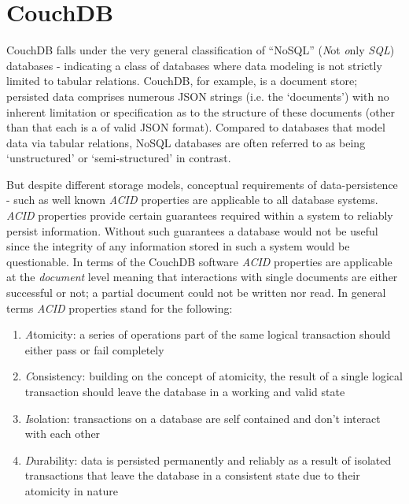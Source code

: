 \section{CouchDB}
CouchDB falls under the very general classification of ``NoSQL'' (\textit{N}ot \textit{o}nly \textit{SQL}) databases - indicating a class of databases where data modeling is not strictly limited to tabular relations. CouchDB, for example, is a document store; persisted data comprises numerous JSON strings (i.e. the `documents') with no inherent limitation or specification as to the structure of these documents (other than that each is a of valid JSON format). Compared to databases that model data via tabular relations, NoSQL databases are often referred to as being `unstructured' or `semi-structured' in contrast.

But despite different storage models, conceptual requirements of data-persistence - such as well known \textit{ACID} properties are applicable to all database systems. \textit{ACID} properties provide certain guarantees required within a system to reliably persist information. Without such guarantees a database would not be useful since the integrity of any information stored in such a system would be questionable. In terms of the CouchDB software \textit{ACID} properties are applicable at the \textit{document} level meaning that interactions with single documents are either successful or not; a partial document could not be written nor read. In general terms \textit{ACID} properties stand for the following:

\begin{enumerate}
    \item \textit{A}tomicity: a series of operations part of the same logical transaction should either pass or fail completely
    \item \textit{C}onsistency: building on the concept of atomicity, the result of a single logical transaction should leave the database in a working and valid state
    \item \textit{I}solation: transactions on a database are self contained and don't interact with each other
    \item \textit{D}urability: data is persisted permanently and reliably as a result of isolated transactions that leave the database in a consistent state due to their atomicity in nature
\end{enumerate}

